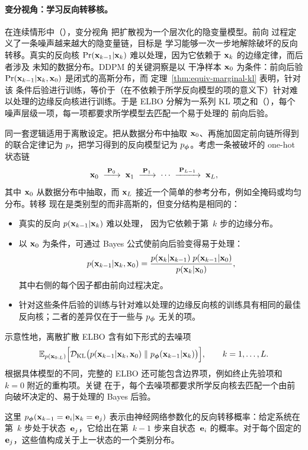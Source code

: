 \paragraph{变分视角：学习反向转移核。}
在连续情形中（），变分视角
把扩散视为一个层次化的隐变量模型。前向
过程定义了一条噪声越来越大的隐变量链，目标是
学习能够一次一步地解除破坏的反向转移。真实的反向核 $\Pr({\mathbf{x}}_{k-1}|{\mathbf{x}}_k)$ 难以处理，因为它依赖于 ${\mathbf{x}}_k$ 的边缘定律，而后者涉及
未知的数据分布。DDPM 的关键洞察是以
干净样本 ${\mathbf{x}}_0$ 为条件：前向后验
$\Pr({\mathbf{x}}_{k-1}|{\mathbf{x}}_k, {\mathbf{x}}_0)$ 是闭式的高斯分布，而
定理~\ref{thm:equiv-marginal-kl} 表明，针对该
条件后验进行训练，等价于（在不依赖于所学反向模型的项的意义下）针对难以处理的边缘反向核进行训练。于是 ELBO
分解为一系列 KL 项之和（），每个噪声层级一项，每一项都要求所学模型去匹配一个易于处理的
前向后验。

同一套逻辑适用于离散设定。把从数据分布中抽取 ${\mathbf{x}}_0$、再施加固定前向链所得到的联合定律记为 $p$，把学习得到的反向模型记为 $p_{{\bm{\phi}}}$。考虑一条被破坏的 one-hot 状态链
\[
{\mathbf{x}}_0 \;\xrightarrow{\;{\mathbf{P}}_0\;}\; {\mathbf{x}}_1 \;\xrightarrow{\;{\mathbf{P}}_1\;}\;
\cdots \;\xrightarrow{\;{\mathbf{P}}_{L-1}\;}\; {\mathbf{x}}_L,
\]
其中 ${\mathbf{x}}_0$ 从数据分布中抽取，而 ${\mathbf{x}}_L$ 接近一个简单的参考分布，例如全掩码或均匀分布。转移
现在是类别型的而非高斯的，但变分结构是相同的：
\begin{itemize}[leftmargin=2em]
    \item 真实的反向 $p({\mathbf{x}}_{k-1}|{\mathbf{x}}_k)$ 难以处理，
      因为它依赖于第~$k$ 步的边缘分布。
    \item 以 ${\mathbf{x}}_0$ 为条件，可通过 Bayes 公式使前向后验变得易于处理：
      \[
      p({\mathbf{x}}_{k-1}|{\mathbf{x}}_k, {\mathbf{x}}_0)
      =
      \frac{p({\mathbf{x}}_k|{\mathbf{x}}_{k-1})\;p({\mathbf{x}}_{k-1}|{\mathbf{x}}_0)}
             {p({\mathbf{x}}_k|{\mathbf{x}}_0)},
      \]
      其中右侧的每个因子都由前向过程决定。
    \item 针对这些条件后验的训练与针对难以处理的边缘反向核的训练具有相同的最佳反向核；二者的差异仅在于一些与 $p_{{\bm{\phi}}}$ 无关的项。
\end{itemize}

示意性地，离散扩散 ELBO 含有如下形式的去噪项
\[
\mathbb{E}_{p({\mathbf{x}}_{0:L})}
 \Big[
\mathcal{D}_{\mathrm{KL}} \big(
  p({\mathbf{x}}_{k-1}|{\mathbf{x}}_k, {\mathbf{x}}_0)
  \;\|\;
  p_{{\bm{\phi}}}({\mathbf{x}}_{k-1}|{\mathbf{x}}_k)
\big)
\Big],
\qquad k=1,\ldots,L.
\]
根据具体模型的不同，完整的 ELBO 还可能包含边界项，例如终止先验项和 $k=0$ 附近的重构项。关键
在于，每个去噪项都要求所学反向核去匹配一个由前向破坏决定的、易于处理的 Bayes 后验。

这里 $p_{{\bm{\phi}}}({\mathbf{x}}_{k-1}={\mathbf{e}}_i|{\mathbf{x}}_k={\mathbf{e}}_j)$ 表示由神经网络参数化的反向转移概率：给定系统在第~$k$ 步处于状态~${\mathbf{e}}_j$，它给出在第~$k{-}1$ 步来自状态~${\mathbf{e}}_i$ 的概率。对于每个固定的 ${\mathbf{e}}_j$，这些值构成关于上一状态的一个类别分布。

